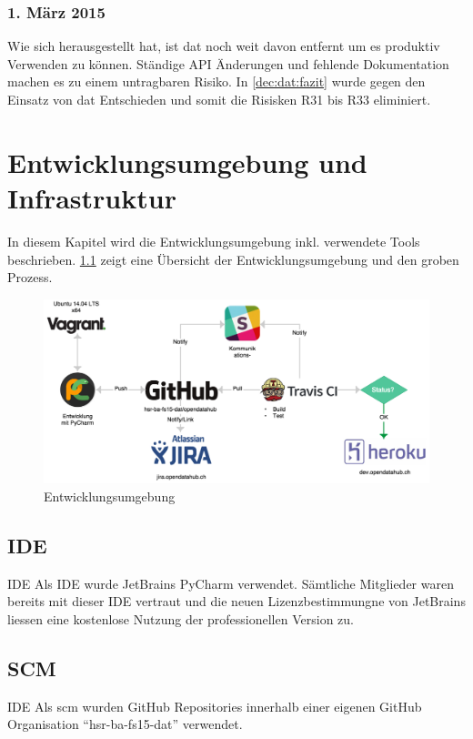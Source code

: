 \subsection{1. März 2015}

Wie sich herausgestellt hat, ist \gls{dat} noch weit davon entfernt um es produktiv Verwenden zu können. Ständige API Änderungen und fehlende Dokumentation machen es zu einem untragbaren Risiko. In \vref{dec:dat:fazit} wurde gegen den Einsatz von \gls{dat} Entschieden und somit die Risisken R31 bis R33 eliminiert.



\chapter{Entwicklungsumgebung und Infrastruktur}
In diesem Kapitel wird die Entwicklungsumgebung inkl. verwendete Tools beschrieben. \cref{fig:pm:entwicklungsumgebung} zeigt eine Übersicht der Entwicklungsumgebung und den groben Prozess.

\begin{figure}[H]
	\centering
	\includegraphics[width=\linewidth]{fig/entwicklungsumgebung}
	\caption{Entwicklungsumgebung}
	\label{fig:pm:entwicklungsumgebung}
\end{figure}

\section{IDE}
\begin{decision}{IDE}
	Als IDE wurde JetBrains PyCharm verwendet. Sämtliche Mitglieder waren bereits mit dieser IDE vertraut und die neuen Lizenzbestimmungne von JetBrains liessen eine kostenlose Nutzung der professionellen Version zu.
\end{decision}
\section{SCM}
\begin{decision}{IDE}
Als \gls{scm} wurden GitHub Repositories innerhalb einer eigenen GitHub Organisation ``hsr-ba-fs15-dat'' verwendet.
\end{decision}

